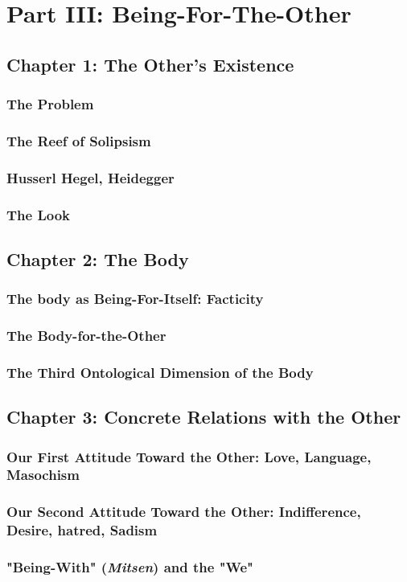 \section{Part III: Being-For-The-Other}

\subsection{Chapter 1: The Other's Existence}

\subsubsection{The Problem}

\subsubsection{The Reef of Solipsism}

\subsubsection{Husserl Hegel, Heidegger}

\subsubsection{The Look}

\subsection{Chapter 2: The Body}

\subsubsection{The body as Being-For-Itself: Facticity}

\subsubsection{The Body-for-the-Other}

\subsubsection{The Third Ontological Dimension of the Body}

\subsection{Chapter 3: Concrete Relations with the Other}

\subsubsection{Our First Attitude Toward the Other: Love, Language, Masochism}

\subsubsection{Our Second Attitude Toward the Other: Indifference, Desire, hatred, Sadism}

\subsubsection{"Being-With" (\emph{Mitsen}) and the "We"}
